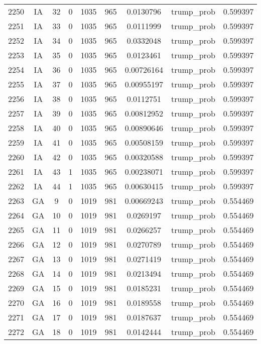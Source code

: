 \documentclass[12pt,a4paper]{article}
\begin{document}
\begin{tabular}{r|cccccccc}
	2250 & IA & 32 & 0 & 1035 & 965 & 0.0130796 & trump\_prob & 0.599397 \\
	2251 & IA & 33 & 0 & 1035 & 965 & 0.0111999 & trump\_prob & 0.599397 \\
	2252 & IA & 34 & 0 & 1035 & 965 & 0.0332048 & trump\_prob & 0.599397 \\
	2253 & IA & 35 & 0 & 1035 & 965 & 0.0123461 & trump\_prob & 0.599397 \\
	2254 & IA & 36 & 0 & 1035 & 965 & 0.00726164 & trump\_prob & 0.599397 \\
	2255 & IA & 37 & 0 & 1035 & 965 & 0.00955197 & trump\_prob & 0.599397 \\
	2256 & IA & 38 & 0 & 1035 & 965 & 0.0112751 & trump\_prob & 0.599397 \\
	2257 & IA & 39 & 0 & 1035 & 965 & 0.00812952 & trump\_prob & 0.599397 \\
	2258 & IA & 40 & 0 & 1035 & 965 & 0.00890646 & trump\_prob & 0.599397 \\
	2259 & IA & 41 & 0 & 1035 & 965 & 0.00508159 & trump\_prob & 0.599397 \\
	2260 & IA & 42 & 0 & 1035 & 965 & 0.00320588 & trump\_prob & 0.599397 \\
	2261 & IA & 43 & 1 & 1035 & 965 & 0.00238071 & trump\_prob & 0.599397 \\
	2262 & IA & 44 & 1 & 1035 & 965 & 0.00630415 & trump\_prob & 0.599397 \\
	2263 & GA & 9 & 0 & 1019 & 981 & 0.00669243 & trump\_prob & 0.554469 \\
	2264 & GA & 10 & 0 & 1019 & 981 & 0.0269197 & trump\_prob & 0.554469 \\
	2265 & GA & 11 & 0 & 1019 & 981 & 0.0266257 & trump\_prob & 0.554469 \\
	2266 & GA & 12 & 0 & 1019 & 981 & 0.0270789 & trump\_prob & 0.554469 \\
	2267 & GA & 13 & 0 & 1019 & 981 & 0.0271419 & trump\_prob & 0.554469 \\
	2268 & GA & 14 & 0 & 1019 & 981 & 0.0213494 & trump\_prob & 0.554469 \\
	2269 & GA & 15 & 0 & 1019 & 981 & 0.0185231 & trump\_prob & 0.554469 \\
	2270 & GA & 16 & 0 & 1019 & 981 & 0.0189558 & trump\_prob & 0.554469 \\
	2271 & GA & 17 & 0 & 1019 & 981 & 0.0187637 & trump\_prob & 0.554469 \\
	2272 & GA & 18 & 0 & 1019 & 981 & 0.0142444 & trump\_prob & 0.554469 \\

\end{tabular}
\end{document}
